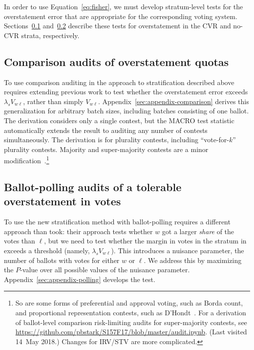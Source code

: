 \documentclass[runningheads]{llncs}
\begin{document}
In order to use Equation~\ref{eq:fisher}, we must develop stratum-level tests for the overstatement error that are appropriate for the corresponding voting system.
Sections~\ref{sec:comparisonError} and~\ref{sec:ballotPollError} describe these tests for overstatement in the CVR and no-CVR strata, respectively.

\subsection{Comparison audits of overstatement quotas}
\label{sec:comparisonError}

To use comparison auditing in the approach to stratification described above requires extending previous work to test whether the overstatement error exceeds $\lambda_s V_{w\ell}$, rather than simply $V_{w\ell}$.
Appendix~\ref{sec:appendix-comparison} derives this generalization for arbitrary batch sizes, including batches consisting of one ballot.
The derivation considers only a single contest, but the 
MACRO test statistic \cite{stark09c,stark10d} automatically extends the result to 
auditing any number of contests simultaneously.
The derivation is for plurality contests, including ``vote-for-$k$'' plurality contests.
Majority and super-majority contests are a minor 
modification~\cite{stark08a}.\footnote{%
  So are some forms of preferential and approval voting, such as Borda count, and
  proportional representation contests, such as D'Hondt~\cite{starkTeague14}.
  For a derivation of ballot-level comparison risk-limiting audits for super-majority contests, 
  see \url{https://github.com/pbstark/S157F17/blob/master/audit.ipynb}. (Last visited 14~May 2018.)
  Changes for IRV/STV are more complicated.
}

\subsection{Ballot-polling audits of a tolerable overstatement in votes}
\label{sec:ballotPollError}

To use the new stratification method with ballot-polling requires a different approach than \cite{lindemanEtal12} took: their approach tests whether $w$ got a larger \emph{share} of the votes than $\ell$, but we need to test whether the margin in votes in the stratum in exceeds a threshold (namely, $\lambda_s V_{w\ell}$).
This introduces a nuisance parameter, the number of ballots with votes for either $w$ or $\ell$.
We address this by maximizing the $P$-value over all possible values of the nuisance parameter.
Appendix~\ref{sec:appendix-polling} develops the test.
\end{document}

